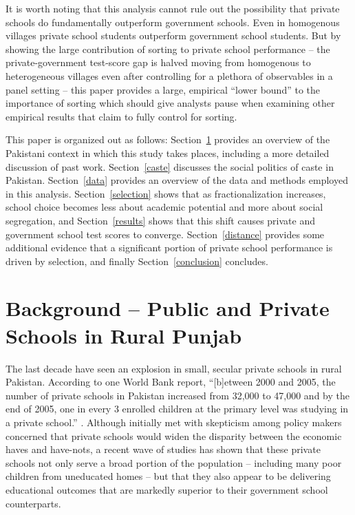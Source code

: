 \documentclass[12pt]{article}
\begin{document}
It is worth noting that this analysis cannot rule out the possibility that private schools do fundamentally outperform government schools. Even in homogenous villages private school students outperform government school students. But by showing the large contribution of sorting to private school performance -- the private-government test-score gap is halved moving from homogenous to heterogeneous villages even after controlling for a plethora of observables in a panel setting -- this paper provides a large, empirical  ``lower bound'' to the importance of sorting which should give analysts pause when examining other empirical results that claim to fully control for sorting. 

This paper is organized out as follows: Section~\ref{overview} provides an overview of the Pakistani context in which this study takes places, including a more detailed discussion of past work. Section~\ref{caste} discusses the social politics of caste in Pakistan. Section~\ref{data} provides an overview of the data and methods employed in this analysis. Section~\ref{selection} shows that as fractionalization increases, school choice becomes less about academic potential and more about social segregation, and Section~\ref{results} shows that this shift causes private and government school test scores to converge. Section~\ref{distance} provides some additional evidence that a significant portion of private school performance is driven by selection, and finally Section~\ref{conclusion} concludes. 

\section{Background -- Public and Private Schools in Rural Punjab}\label{overview}

The last decade have seen an explosion in small, secular private schools in rural Pakistan. According to one World Bank report, ``[b]etween 2000 and 2005, the number of private schools in Pakistan increased from 32,000 to 47,000 and by the end of 2005, one in every 3 enrolled children at the primary level was studying in a private school.'' \citep[p. vi]{Andrabi:2007we}. Although initially met with skepticism among policy makers concerned that private schools would widen the disparity between the economic haves and have-nots, a recent wave of studies has shown that these private schools not only serve a broad portion of the population -- including many poor children from uneducated homes -- but that they also appear to be delivering educational outcomes that are markedly superior to their government school counterparts. 
\end{document}
